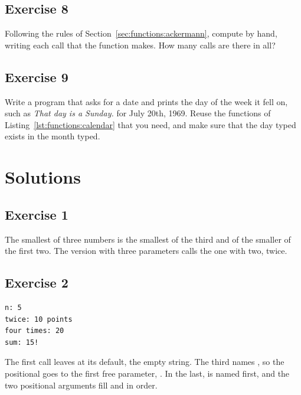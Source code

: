 \subsection*{Exercise 8}

Following the rules of Section~\ref{sec:functions:ackermann}, compute
 by hand, writing each call that the function makes. How
many calls are there in all?

\subsection*{Exercise 9}

Write a program that asks for a date and prints the day of the week it fell on,
such as \textit{That day is a Sunday.} for July 20th, 1969. Reuse the functions of
Listing~\ref{lst:functions:calendar} that you need, and make sure that the day
typed exists in the month typed.

\vfill%
\pagebreak

\forceevenpage{}

\section*{Solutions}
%
\subsection*{Exercise 1}

The smallest of three numbers is the smallest of the third and of the smaller of
the first two. The version with three parameters calls the one with two, twice.



\subsection*{Exercise 2}

\begin{lstlisting}[style=bashVerb]
n: 5
twice: 10 points
four times: 20
sum: 15!
\end{lstlisting}

The first call leaves  at its default, the empty string. The third
names , so the positional  goes to the first
free parameter, . In the last,  is named first, and the
two positional arguments fill  and  in order.

